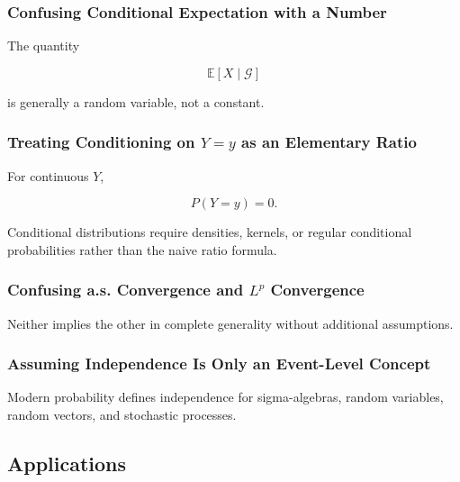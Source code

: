 \subsubsection{Confusing Conditional Expectation with a Number}

The quantity

\[
\mathbb{E}[X\mid\mathcal{G}]
\]

is generally a random variable, not a constant.

\subsubsection{Treating Conditioning on \(Y=y\) as an Elementary Ratio}

For continuous \(Y\),

\[
P(Y=y)=0.
\]

Conditional distributions require densities, kernels, or regular
conditional probabilities rather than the naive ratio formula.

\subsubsection{Confusing a.s. Convergence and \(L^p\) Convergence}

Neither implies the other in complete generality without additional
assumptions.

\subsubsection{Assuming Independence Is Only an Event-Level Concept}

Modern probability defines independence for sigma-algebras, random
variables, random vectors, and stochastic processes.

\subsection{Applications}
\label{subsec:measure-probability-applications}

